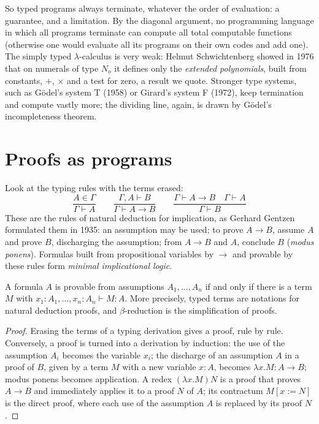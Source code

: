 So typed programs always terminate, whatever the order of evaluation: a guarantee, and a limitation. By the diagonal argument, no programming language in which all programs terminate can compute all total computable functions (otherwise one would evaluate all its programs on their own codes and add one). The simply typed $\lambda$-calculus is very weak: Helmut Schwichtenberg showed in 1976 that on numerals of type $N_o$ it defines only the \emph{extended polynomials}, built from constants, $+$, $\times$ and a test for zero, a result we quote. Stronger type systems, such as Gödel's system T (1958) or Girard's system F (1972), keep termination and compute vastly more; the dividing line, again, is drawn by Gödel's incompleteness theorem.

\section{Proofs as programs}\label{sec:curryhoward}

Look at the typing rules with the terms erased:
\[
\frac{A\in\Gamma}{\Gamma\vdash A}\qquad
\frac{\Gamma,A\vdash B}{\Gamma\vdash A\to B}\qquad
\frac{\Gamma\vdash A\to B\quad\Gamma\vdash A}{\Gamma\vdash B}
\]
These are the rules of natural deduction for implication, as Gerhard Gentzen formulated them in 1935: an assumption may be used; to prove $A\to B$, assume $A$ and prove $B$, discharging the assumption; from $A\to B$ and $A$, conclude $B$ (\emph{modus ponens}). Formulas built from propositional variables by $\to$ and provable by these rules form \emph{minimal implicational logic}.

\begin{proposition}\label{prop:curryhoward}
A formula $A$ is provable from assumptions $A_1,\dots,A_n$ if and only if there is a term $M$ with $x_1:A_1,\dots,x_n:A_n\vdash M:A$. More precisely, typed terms are notations for natural deduction proofs, and $\beta$-reduction is the simplification of proofs.
\end{proposition}

\begin{proof}
Erasing the terms of a typing derivation gives a proof, rule by rule. Conversely, a proof is turned into a derivation by induction: the use of the assumption $A_i$ becomes the variable $x_i$; the discharge of an assumption $A$ in a proof of $B$, given by a term $M$ with a new variable $x:A$, becomes $\lambda x.M:A\to B$; modus ponens becomes application. A redex $(\lambda x.M)N$ is a proof that proves $A\to B$ and immediately applies it to a proof $N$ of $A$; its contractum $M[x:=N]$ is the direct proof, where each use of the assumption $A$ is replaced by its proof $N$.
\end{proof}

